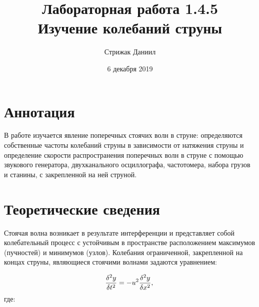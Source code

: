 \documentclass{article}
\title{Лабораторная работа 1.4.5\\Изучение колебаний струны}
\date{6 декабря 2019}
\author{Стрижак Даниил}
\begin{document}
  \maketitle
  \newpage
  
  

\section{Аннотация}

В работе изучается явление поперечных стоячих волн в струне: определяются собственные частоты колебаний струны в зависимости от натяжения струны и определение скорости распространения поперечных волн в струне с помощью звукового генератора, двухканального осциллографа, частотомера, набора грузов и станины, с закрепленной на ней струной.


\section{Теоретические сведения}

Стоячая волна возникает в результате интерференции и представляет собой колебательный процесс с
устойчивым в пространстве расположением максимумов (пучностей) и минимумов (узлов).
Колебания ограниченной, закрепленной на концах струны, являющиеся стоячими волнами задаются
уравнением:

\begin{equation*}
  \frac{\delta^2y}{\delta t^2} = - u^2\frac{\delta^2y}{\delta x^2},\\	
\end{equation*}
где:
\end{document}
